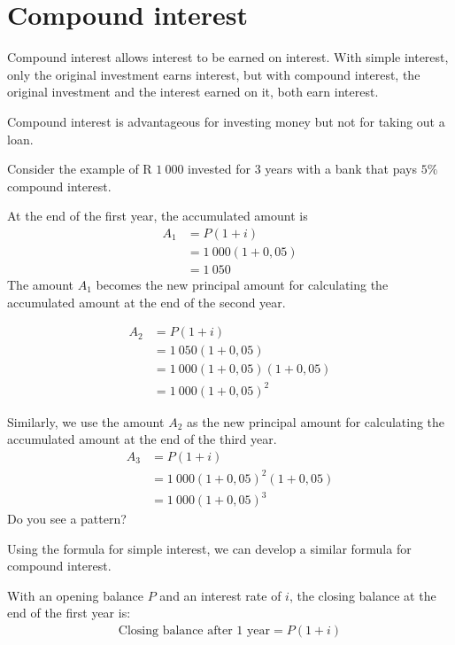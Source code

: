 \section{Compound interest}

Compound interest allows interest to be earned on interest. With simple interest, only the original investment earns interest, but with compound interest, the original investment and the interest earned on it, both earn interest.

Compound interest is advantageous for investing money but not for taking out a loan.

Consider the example of R $1~000$ invested for $3$ years with a bank that pays $5\%$ compound interest.

At the end of the first year, the accumulated amount is 
\begin{align*}
  A_1 &= P(1 + i)\\
  &= 1~000(1+0,05)\\
  &=1~050
\end{align*}
The amount $A_1$ becomes the new principal amount for calculating the accumulated amount at the end of the second year.

\begin{align*}
    A_2 &= P(1 + i)\\
&= 1~050(1+0,05)\\
&=1~000(1+0,05)(1+0,05)\\
&= 1~000(1+0,05)^2
\end{align*}

Similarly, we use the amount $A_2$ as the new principal amount for calculating the accumulated amount at the end of the third year.
\begin{align*}
    A_3 &= P(1 + i)\\
&=1~000(1+0,05)^2(1+0,05)\\
&= 1~000(1+0,05)^3
\end{align*}
Do you see a pattern?

Using the formula for simple interest, we can develop a similar formula for compound interest.

With an opening balance $P$ and an interest rate of $i$, the closing balance at the end of the first year is:
\begin{eqnarray*}
    \mbox{Closing balance after $1$ year} = P(1 + i)
\end{eqnarray*}

